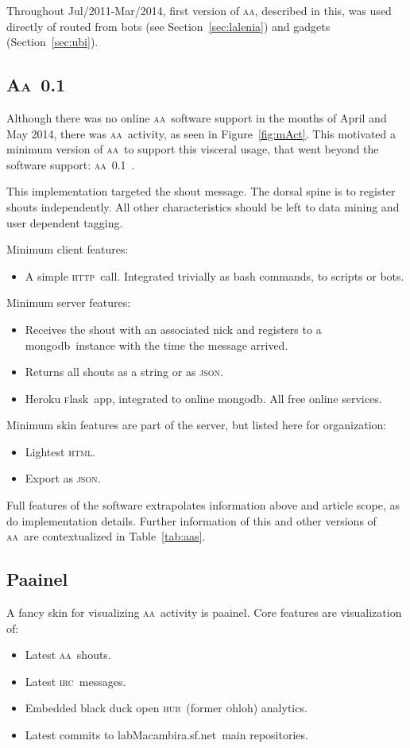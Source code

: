 \documentclass[a4paper, 11pt]{article} %
\newcommand{\bdoh}{{\sc b}lack {\sc d}uck {\sc o}pen \textsc{hub}}
\newcommand{\ohloh}{\textsc{o}hloh}
\newcommand{\irc}{\textsc{irc}}
\newcommand{\httpb}{\textsc{http}}
\newcommand{\html}{\textsc{html}}
\newcommand{\aab}{\textsc{aa}}
\newcommand{\json}{\textsc{json}}
\newcommand{\flask}{\textsc{f}lask}
\newcommand{\aai}{\textsc{Aa}}
\newcommand{\mongodb}{{\sc m}ongo{\sc db}}
\newcommand{\paaineli}{P{\bf \sc aa}inel}
\newcommand{\paainel}{p{\sc aa}inel}
\newcommand{\lm}{lab\textsc{M}acambira.sf.net}
\begin{document}
Throughout Jul/2011-Mar/2014, first version of \aab, described in this, was used directly of routed from bots (see Section~\ref{sec:lalenia}) and gadgets (Section~\ref{sec:ubi}).

\subsection{\aai\ 0.1}\label{sec:aa01}
Although there was no online \aab\ software support in the months of April and May 2014, there was \aab\ activity, as seen in Figure~\ref{fig:mAct}. This motivated a minimum version of \aab\ to support this visceral usage, that went beyond the software support: \aab\ 0.1~\cite{aa01r}.

This implementation targeted the shout message. The dorsal spine is to register shouts independently. All other characteristics should be left to data mining and user dependent tagging.

Minimum client features:
\begin{itemize}
    \item A simple \httpb\ call. Integrated trivially as bash commands, to scripts or bots.
\end{itemize}

Minimum server features:
\begin{itemize}
    \item Receives the shout with an associated nick and registers to a \mongodb\ instance with the time the message arrived.
    \item Returns all shouts as a string or as \json.
    \item Heroku \flask\ app, integrated to online \mongodb. All free online services. 
\end{itemize}

Minimum skin features are part of the server, but listed here for organization:
\begin{itemize}
    \item Lightest \html.
    \item Export as \json.
\end{itemize}

Full features of the software extrapolates information above and article scope, as do implementation details. Further information of this and other versions of \aab\ are contextualized in Table~\ref{tab:aas}.


\subsection{\paaineli}\label{sec:aaPaainel}
A fancy skin for visualizing \aab\ activity is \paainel. Core features are visualization of:
\begin{itemize}
    \item Latest \aab\ shouts.
    \item Latest \irc\ messages.
    \item Embedded \bdoh\ (former \ohloh) analytics.
    \item Latest commits to \lm\ main repositories.
\end{itemize}
\end{document}
